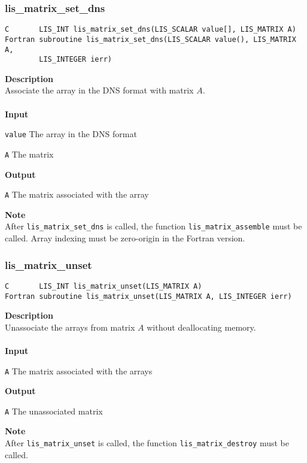 \documentclass[a4paper]{article}
\newcommand{\namelistlabel}[1]{\mbox{#1}\hfill}
\newenvironment{namelist}[1]{%
\begin{list}{}
  {\let\makelabel\namelistlabel
  \settowidth{\labelwidth}{#1}
  \setlength{\leftmargin}{1.1\labelwidth}}
  }{%
\end{list}}
\begin{document}
\subsubsection{lis\_matrix\_set\_dns}
\begin{screen}
\verb|C       LIS_INT lis_matrix_set_dns(LIS_SCALAR value[], LIS_MATRIX A)|\\
\verb|Fortran subroutine lis_matrix_set_dns(LIS_SCALAR value(), LIS_MATRIX A,|\\
\verb|        LIS_INTEGER ierr)|
\end{screen}
{\bf Description}\\
\indent
Associate the array in the DNS format with matrix $A$.
\\ \\
\noindent
{\bf Input}
\begin{namelist}{XXXXXXXXXXXXXXXXXXXX}
\item[\tt value] The array in the DNS format
\item[\tt A] The matrix
\end{namelist}
{\bf Output}
\begin{namelist}{XXXXXXXXXXXXXXXXXXXX}
\item[\tt A] The matrix associated with the array
\end{namelist}
\noindent
{\bf Note}\\
\indent
After \verb|lis_matrix_set_dns| is called, 
the function \verb|lis_matrix_assemble| must be called. 
Array indexing must be zero-origin in the Fortran version.

\subsubsection{lis\_matrix\_unset}
\begin{screen}
\verb|C       LIS_INT lis_matrix_unset(LIS_MATRIX A)|\\
\verb|Fortran subroutine lis_matrix_unset(LIS_MATRIX A, LIS_INTEGER ierr)|
\end{screen}
{\bf Description}\\
\indent
Unassociate the arrays from matrix $A$ without deallocating memory.
\\ \\
\noindent
{\bf Input}
\begin{namelist}{XXXXXXXXXXXXXXXXXXXX}
\item[\tt A] The matrix associated with the arrays
\end{namelist}
{\bf Output}
\begin{namelist}{XXXXXXXXXXXXXXXXXXXX}
\item[\tt A] The unassociated matrix
\end{namelist}
\noindent
{\bf Note}\\
\indent
After \verb|lis_matrix_unset| is called, 
the function \verb|lis_matrix_destroy| must be called. 
\end{document}
